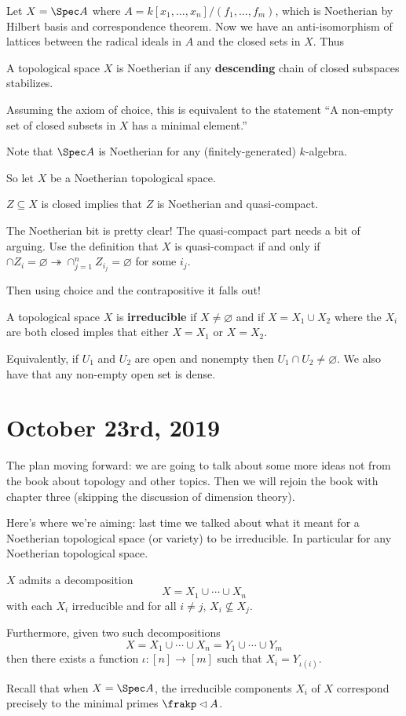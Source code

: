 \documentclass[12pt]{article}
\begin{document}
Let $X=\Spec A$ where $A=k[x_1,\dots,x_n]/(f_1,\dots,f_m)$, which is Noetherian by Hilbert basis and correspondence theorem.
Now we have an anti-isomorphism of lattices between the radical ideals in $A$ and the closed sets in $X$.
Thus 
\begin{defn}
	A topological space $X$ is Noetherian if any \textbf{descending} chain of closed subspaces stabilizes.
\end{defn}
\begin{rmk}
	Assuming the axiom of choice, this is equivalent to the statement ``A non-empty set of closed subsets in $X$ has 
	a minimal element.''
\end{rmk}
\begin{rmk}
	Note that $\Spec A$ is Noetherian for any (finitely-generated) $k$-algebra.
\end{rmk}
So let $X$ be a Noetherian topological space.
\begin{lem}
	$Z\subseteq X$ is closed implies that $Z$ is Noetherian and quasi-compact.
\end{lem}
\begin{rmk}
	The Noetherian bit is pretty clear! The quasi-compact part needs a bit of arguing. Use the definition that $X$ is quasi-compact 
	if and only if $\cap Z_i=\varnothing\twoheadrightarrow \cap_{j=1}^n Z_{i_j}=\varnothing$ for some $i_j$.

	Then using choice and the contrapositive it falls out!
\end{rmk}
\begin{defn}
	A topological space $X$ is \textbf{irreducible} if $X\ne\varnothing$ and if $X=X_1\cup X_2$ where 
	the $X_i$ are both closed imples that either $X=X_1$ or $X=X_2$.
\end{defn}
\begin{rmk}
	Equivalently, if $U_1$ and $U_2$ are open and nonempty then $U_1\cap U_2\ne\varnothing$.
	We also have that any non-empty open set is dense.
\end{rmk}

\section{October 23rd, 2019}
The plan moving forward: we are going to talk about some more ideas not from the book about topology and other topics.
Then we will rejoin the book with chapter three (skipping the discussion of dimension theory).

Here's where we're aiming: last time we talked about what it meant for a Noetherian topological space (or variety) to be irreducible.
In particular for any Noetherian topological space.
\begin{thm}\label{thm:decomp}
	$X$ admits a decomposition 
	\[X=X_1\cup\cdots\cup X_n\]
	with each $X_i$ irreducible and for all $i\ne j$, $X_i\not\subseteq X_j$. 

	Furthermore, given two such decompositions 
	\[X=X_1\cup\cdots\cup X_n=Y_1\cup\cdots\cup Y_m\]
	then there exists a function $\iota:[n]\to[m]$ such that $X_i=Y_{\iota(i)}$.
\end{thm}
Recall that when $X=\Spec A$, the irreducible components $X_i$ of $X$ correspond precisely to the minimal primes $\frakp\lhd A$.
\end{document}
